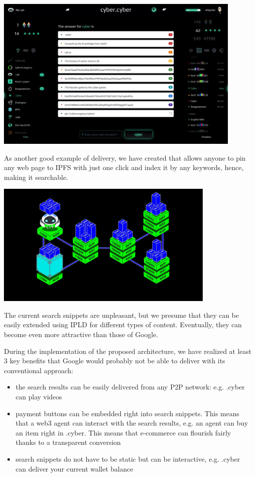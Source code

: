 \documentclass[8pt,oneside]{amsart}
\newcommand{\linkred}[2]{\href{#1}{\color{red}{#2}}}
\newcommand{\code}[1]{{\PlayBold #1}}
\newenvironment{Figure}
  {\par\medskip\noindent\minipage{\linewidth}}
  {\endminipage\par\medskip}
\begin{document}
\begin{Abstract}
\begin{Figure}
  \medskip
  \centering
  \includegraphics[width=0.9\textwidth]{cyb.jpg}
  \medskip
\end{Figure}

As another good example of delivery, we have created \linkred{https://github.com/cybercongress/cyb-virus}{a Chrome extension} that allows anyone to pin any web page to IPFS with just one click and index it by any keywords, hence, making it searchable.

\begin{Figure}
  \centering
  \includegraphics[width=0.8\textwidth]{architecture.jpg}
\end{Figure}

The current search snippets are unpleasant, but we presume that they can be easily extended using IPLD for different types of content. Eventually, they can become even more attractive than those of Google.

During the implementation of the proposed architecture, we have realized at least 3 key benefits that Google would probably not be able to deliver with its conventional approach:

\begin{itemize}
\item the search results can be easily delivered from any P2P network: e.g. .cyber can play videos
\item payment buttons can be embedded right into search snippets. This means that a web3 agent can interact with the search results, e.g. an agent can buy an item right in \code{.cyber}. This means that e-commerce can flourish fairly thanks to a transparent conversion
\item search snippets do not have to be static but can be interactive, e.g. \code{.cyber} can deliver your current wallet balance
\end{itemize}


\end{Abstract}
\end{document}
